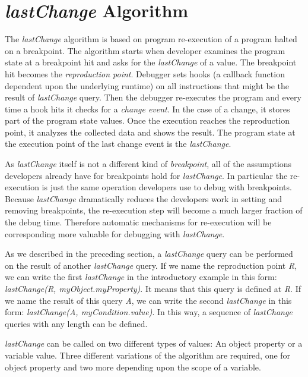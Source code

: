 \documentclass[runningheads,a4paper]{llncs}
\begin{document}
\section{\textit{lastChange} Algorithm}

The \textit{lastChange} algorithm is based on program re-execution of
a program halted on a breakpoint. The algorithm starts when developer
examines the program state at a breakpoint hit and asks for the
\textit{lastChange} of a value. The breakpoint hit becomes the
\textit{reproduction point}. Debugger sets hooks (a callback
function dependent upon the underlying runtime) on all instructions
that might be the result of \textit{lastChange} query. Then the
debugger re-executes the program and every time a hook hits it
checks for a \textit{change event}. In the case of a change, it stores
part of the program state values.  Once the execution reaches the
reproduction point, it analyzes the collected data and shows the
result.  The program state at the execution point of the last change
event is the \textit{lastChange}.

As \textit{lastChange} itself is not a different kind of \textit{breakpoint},
all of the assumptions developers already have for breakpoints hold
for \textit{lastChange}. In particular the re-execution is just the
same operation developers use to debug with breakpoints. Because
\textit{lastChange} dramatically reduces the developers work in
setting and removing breakpoints, the re-execution step will become a
much larger fraction of the debug time. Therefore automatic mechanisms
for re-execution will be corresponding more valuable for debugging
with \textit{lastChange}.

As we described in the preceding section, a \textit{lastChange} query can
be performed on the result of another \textit{lastChange} query. If we
name the reproduction point \textit{R}, we can write the first
\textit{lastChange} in the introductory example in this form:
\textit{lastChange(R, myObject.myProperty)}. It means that this query
is defined at \textit{R}. If we name the result of this query
\textit{A}, we can write the second \textit{lastChange} in this form:
\textit{lastChange(A, myCondition.value)}. In this way, a sequence of
\textit{lastChange} queries with any length can be defined.

\textit{lastChange} can be called on two different types of values: An
object property or a variable value. Three different variations of the
algorithm are required, one for object property and two more depending
upon the scope of a variable.
\end{document}
